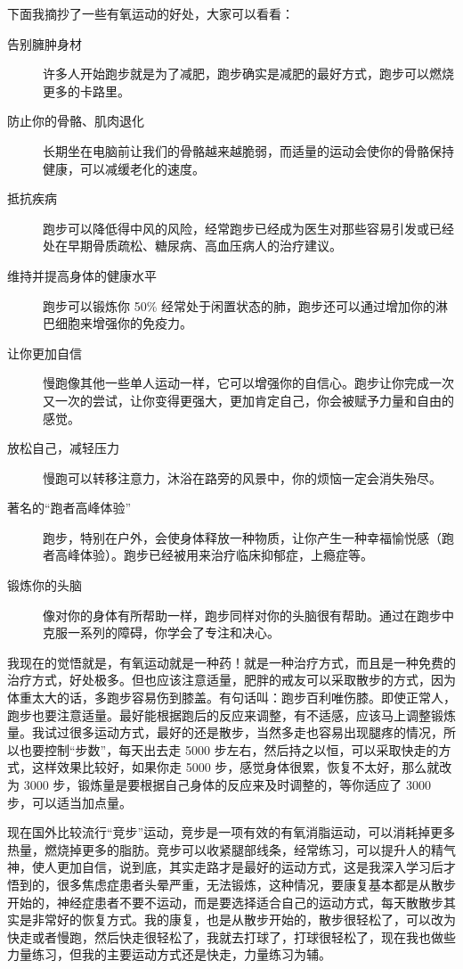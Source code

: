 \documentclass{ctexart}
\begin{document}
下面我摘抄了一些有氧运动的好处，大家可以看看：

\begin{description}
    \item[告别臃肿身材] 许多人开始跑步就是为了减肥，跑步确实是减肥的最好方式，跑步可以燃烧更多的卡路里。
    \item[防止你的骨骼、肌肉退化] 长期坐在电脑前让我们的骨骼越来越脆弱，而适量的运动会使你的骨骼保持健康，可以减缓老化的速度。
    \item[抵抗疾病] 跑步可以降低得中风的风险，经常跑步已经成为医生对那些容易引发或已经处在早期骨质疏松、糖尿病、高血压病人的治疗建议。
    \item[维持并提高身体的健康水平] 跑步可以锻炼你 50\% 经常处于闲置状态的肺，跑步还可以通过增加你的淋巴细胞来增强你的免疫力。
    \item[让你更加自信] 慢跑像其他一些单人运动一样，它可以增强你的自信心。跑步让你完成一次又一次的尝试，让你变得更强大，更加肯定自己，你会被赋予力量和自由的感觉。
    \item[放松自己，减轻压力] 慢跑可以转移注意力，沐浴在路旁的风景中，你的烦恼一定会消失殆尽。
    \item[著名的“跑者高峰体验”] 跑步，特别在户外，会使身体释放一种物质，让你产生一种幸福愉悦感（跑者高峰体验）。跑步已经被用来治疗临床抑郁症，上瘾症等。
    \item[锻炼你的头脑] 像对你的身体有所帮助一样，跑步同样对你的头脑很有帮助。通过在跑步中克服一系列的障碍，你学会了专注和决心。
\end{description}

我现在的觉悟就是，有氧运动就是一种药！就是一种治疗方式，而且是一种免费的治疗方式，好处极多。但也应该注意适量，肥胖的戒友可以采取散步的方式，因为体重太大的话，多跑步容易伤到膝盖。有句话叫：跑步百利唯伤膝。即使正常人，跑步也要注意适量。最好能根据跑后的反应来调整，有不适感，应该马上调整锻炼量。我试过很多运动方式，最好的还是散步，当然多走也容易出现腿疼的情况，所以也要控制“步数”，每天出去走 5000 步左右，然后持之以恒，可以采取快走的方式，这样效果比较好，如果你走 5000 步，感觉身体很累，恢复不太好，那么就改为 3000 步，锻炼量是要根据自己身体的反应来及时调整的，等你适应了 3000 步，可以适当加点量。

现在国外比较流行“竞步”运动，竞步是一项有效的有氧消脂运动，可以消耗掉更多热量，燃烧掉更多的脂肪。竞步可以收紧腿部线条，经常练习，可以提升人的精气神，使人更加自信，说到底，其实走路才是最好的运动方式，这是我深入学习后才悟到的，很多焦虑症患者头晕严重，无法锻炼，这种情况，要康复基本都是从散步开始的，神经症患者不要不运动，而是要选择适合自己的运动方式，每天散散步其实是非常好的恢复方式。我的康复，也是从散步开始的，散步很轻松了，可以改为快走或者慢跑，然后快走很轻松了，我就去打球了，打球很轻松了，现在我也做些力量练习，但我的主要运动方式还是快走，力量练习为辅。
\end{document}
